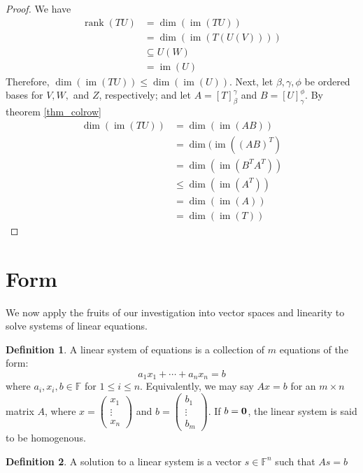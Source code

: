\documentclass[oneside, 12pt]{book}
\DeclareMathOperator{\rank}{rank}
\DeclareMathOperator{\im}{im}
\theoremstyle{definition}
\newtheorem{defn}{Definition}[section]
\begin{document}
\begin{proof}
  We have
  \begin{align}
    \rank(TU)&=\dim(\im(TU)) \\
            &= \dim(\im(T(U(V)))) \\
            &\subseteq U(W) \\
            &= \im(U)
  \end{align}
  Therefore, $\dim(\im(TU))\leq \dim(\im(U))$. Next, let $\beta, \gamma, \phi$ be ordered bases for $V, W, $ and $Z$, respectively; and let
  $A=[T]_{\beta}^{\gamma}$ and $B=[U]_{\gamma}^{\phi}$.
  By theorem \ref{thm_colrow}
  \begin{align}
    \dim(\im(TU))&=\dim(\im(AB)) \\
                 &= \dim(\im((AB)^{T}) \\
                 &= \dim(\im(B^{T}A^{T})) \\
                 &\leq \dim(\im(A^{T})) \\
                 &= \dim(\im(A)) \\
    &= \dim(\im(T))
  \end{align}
\end{proof}
\section{Form}
We now apply the fruits of our investigation into vector spaces and linearity to solve systems of linear equations.
\begin{defn}
\label{def_linsys}
  A linear system of equations is a collection of $m$ equations of the form:
  \[ a_{1}x_{1}+ \cdots +a_{n}x_{n}=b \] where $a_{i}, x_{i},b \in \mathbb{F}$ for $1 \leq i \leq n$.
  Equivalently, we may say
  $Ax=b$ for an $m \times n$ matrix $A$, where $x= \begin{pmatrix} x_{1} \\ \vdots \\ x_{n}\end{pmatrix}$ and $b= \begin{pmatrix} b_{1} \\ \vdots \\ b_{m}\end{pmatrix}$.
  If $b=\bold{0}$, the linear system is said to be homogenous.
\end{defn}
\begin{defn}

A solution to a linear system is a vector $s \in \mathbb{F}^{n}$ such that $As=b$
\end{defn}
\end{document}
